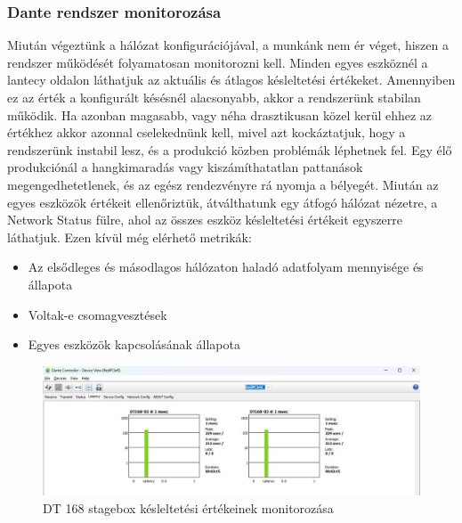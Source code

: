 \subsubsection{Dante rendszer monitorozása}
Miután végeztünk a hálózat konfigurációjával, a munkánk nem ér véget, hiszen
a rendszer működését folyamatosan monitorozni kell. 
Minden egyes eszköznél a lantecy oldalon láthatjuk az aktuális és átlagos késleltetési értékeket.
Amennyiben ez az érték a konfigurált késésnél alacsonyabb, akkor a rendszerünk
stabilan működik. Ha azonban magasabb, vagy néha drasztikusan közel kerül ehhez az értékhez akkor azonnal cselekednünk kell, mivel
azt kockáztatjuk, hogy a rendszerünk instabil lesz, és a produkció közben problémák léphetnek fel.
Egy élő produkciónál a hangkimaradás vagy kiszámíthatatlan pattanások megengedhetetlenek, és az egész rendezvényre 
rá nyomja a bélyegét. Miután az egyes eszközök értékeit ellenőriztük, átválthatunk egy átfogó hálózat nézetre,
a Network Status fülre, ahol az összes eszköz késleltetési értékeit egyszerre láthatjuk. Ezen kívül még elérhető
metrikák:
\begin{itemize}
    \item Az elsődleges és másodlagos hálózaton haladó adatfolyam mennyisége és állapota
    \item Voltak-e csomagvesztések
    \item Egyes eszközök kapcsolásának állapota
\end{itemize}
\begin{figure}[H]
	\centering
	\includegraphics[width=\textwidth, keepaspectratio]{figures/dante_latency.jpg}
	\caption{DT 168 stagebox késleltetési értékeinek monitorozása}\label{fig:dante_latency}
\end{figure}
\newpage
